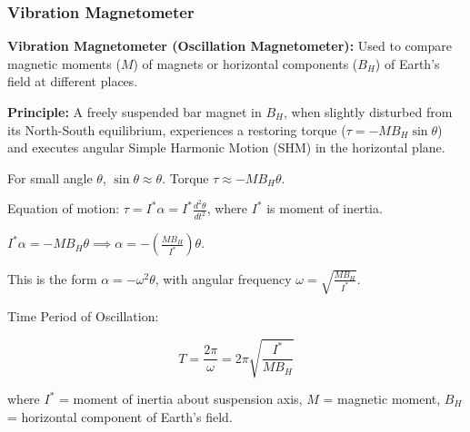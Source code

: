 \transfade[duration=0.5]

\begin{frame}[t]
    \frametitle{\textcolor{deepnavy}{\textbf{Vibration Magnetometer}}}
    \renewcommand{\familydefault}{\rmdefault}
    \small

      \item<+-> \textbf{Vibration Magnetometer (Oscillation Magnetometer):}   Used to compare magnetic moments ($M$) of magnets or horizontal components ($B_H$) of Earth's field at different places.
      \item<+-> \textbf{Principle:} A freely suspended bar magnet in $B_H$, when slightly disturbed from its North-South equilibrium, experiences a restoring torque ($\tau = -MB_H \sin\theta$) and executes angular Simple Harmonic Motion (SHM) in the horizontal plane.

    \item<+-> For small angle $\theta$, $\sin\theta \approx \theta$.   Torque $\tau \approx -MB_H \theta$.
      \item<+-> Equation of motion: $\tau = I^* \alpha = I^* \frac{d^2\theta}{dt^2}$, where $I^*$ is moment of inertia.
      \item<+-> $I^* \alpha = -MB_H \theta \implies \alpha = -\left(\frac{MB_H}{I^*}\right) \theta$.
      \item<+-> This is the form $\alpha = -\omega^2 \theta$, with angular frequency $\omega = \sqrt{\frac{MB_H}{I^*}}$.

      \item<+-> Time Period of Oscillation:
        \begin{tcolorbox}[colback=blue!5,colframe=blue!80,boxrule=0.5pt,arc=1mm,boxsep=1pt]
        \begin{equation*}
             T = \frac{2\pi}{\omega} = 2\pi \sqrt{\frac{I^*}{M B_H}}
        \end{equation*}
        \end{tcolorbox}
          where $I^*$ = moment of inertia about suspension axis, $M$ = magnetic moment, $B_H$ = horizontal component of Earth's field.


\end{frame}
